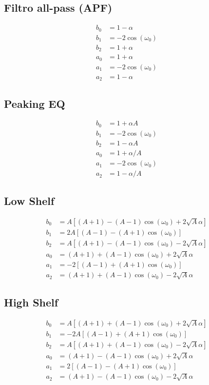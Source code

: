 \subsection*{Filtro all-pass (APF)}
\begin{align*}
b_0 &= 1 - \alpha \\
b_1 &= -2 \cos(\omega_0) \\
b_2 &= 1 + \alpha \\
a_0 &= 1 + \alpha \\
a_1 &= -2 \cos(\omega_0) \\
a_2 &= 1 - \alpha
\end{align*}

\subsection*{Peaking EQ}
\begin{align*}
b_0 &= 1 + \alpha A \\
b_1 &= -2 \cos(\omega_0) \\
b_2 &= 1 - \alpha A \\
a_0 &= 1 + \alpha / A \\
a_1 &= -2 \cos(\omega_0) \\
a_2 &= 1 - \alpha / A
\end{align*}

\subsection*{Low Shelf}
\begin{align*}
b_0 &= A\left[(A+1) - (A-1)\cos(\omega_0) + 2\sqrt{A}\alpha\right] \\
b_1 &= 2A\left[(A-1) - (A+1)\cos(\omega_0)\right] \\
b_2 &= A\left[(A+1) - (A-1)\cos(\omega_0) - 2\sqrt{A}\alpha\right] \\
a_0 &= (A+1) + (A-1)\cos(\omega_0) + 2\sqrt{A}\alpha \\
a_1 &= -2\left[(A-1) + (A+1)\cos(\omega_0)\right] \\
a_2 &= (A+1) + (A-1)\cos(\omega_0) - 2\sqrt{A}\alpha
\end{align*}

\subsection*{High Shelf}
\begin{align*}
b_0 &= A\left[(A+1) + (A-1)\cos(\omega_0) + 2\sqrt{A}\alpha\right] \\
b_1 &= -2A\left[(A-1) + (A+1)\cos(\omega_0)\right] \\
b_2 &= A\left[(A+1) + (A-1)\cos(\omega_0) - 2\sqrt{A}\alpha\right] \\
a_0 &= (A+1) - (A-1)\cos(\omega_0) + 2\sqrt{A}\alpha \\
a_1 &= 2\left[(A-1) - (A+1)\cos(\omega_0)\right] \\
a_2 &= (A+1) - (A-1)\cos(\omega_0) - 2\sqrt{A}\alpha
\end{align*}

